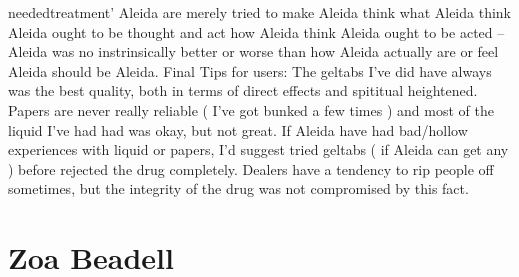 \documentclass[12pt]{book}
\begin{document}
neededtreatment' Aleida are merely tried to make Aleida think what Aleida think Aleida ought to be thought and act how Aleida think Aleida ought to be acted -- Aleida was no instrinsically better or worse than how Aleida actually are or feel Aleida should be Aleida. Final Tips for users: The geltabs I've did have always was the best quality, both in terms of direct effects and spititual heightened. Papers are never really reliable ( I've got bunked a few times ) and most of the liquid I've had had was okay, but not great. If Aleida have had bad/hollow experiences with liquid or papers, I'd suggest tried geltabs ( if Aleida can get any ) before rejected the drug completely. Dealers have a tendency to rip people off sometimes, but the integrity of the drug was not compromised by this fact.



\chapter{Zoa Beadell}
\end{document}
